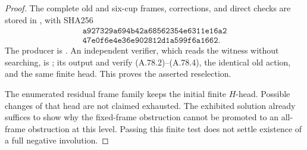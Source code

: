 \begin{proof}
The complete old and six-cup frames, corrections, and direct checks
are stored in
,
with SHA256
\[
\begin{gathered}
 \texttt{a927329a694b42a68562354e6311e16a2}\\
 \texttt{47e0f6e4e36e902812d1a599f6a1662}.
\end{gathered}
 \tag{A.78.5}
\]
The producer is
.
An independent verifier, which reads the witness without searching,
is
;
its output and
verify (A.78.2)--(A.78.4), the identical old action, and the same
finite head. This proves the asserted reselection.

The enumerated residual frame family keeps the initial finite
\(H\)-head. Possible changes of that head are not claimed
exhausted. The exhibited solution already suffices to show why
the fixed-frame obstruction cannot be promoted to an all-frame
obstruction at this level. Passing this finite test does not
settle existence of a full negative involution.
\end{proof}
